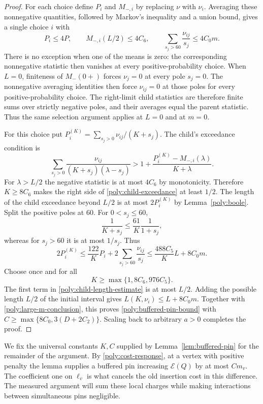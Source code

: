 \begin{proof}
For each choice define $P_i$ and $M_{-,i}$ by replacing $\nu$ with
$\nu_i$. Averaging these nonnegative quantities, followed by Markov's
inequality and a union bound, gives a single choice $i$ with
\begin{equation}\label{poly:small-m-selection}
 P_i\leq4P,\qquad
 M_{-,i}(L/2)\leq4C_6,\qquad
 \sum_{s_j>60}\frac{\nu_{ij}}{s_j}\leq4C_0m.
\end{equation}
There is no exception when one of the means is zero: the corresponding
nonnegative statistic then vanishes at every positive-probability
choice. When $L=0$, finiteness of $M_-(0+)$ forces $\nu_j=0$ at every
pole $s_j=0$. The nonnegative averaging identities then force
$\nu_{ij}=0$ at those poles for every positive-probability choice.
The right-limit child statistics are therefore finite sums over
strictly negative poles, and their averages equal the parent statistic.
Thus the same selection
argument applies at $L=0$ and at $m=0$.

For this choice put $P_i^{(K)}=\sum_{s_j>0}\nu_{ij}/(K+s_j)$.
The child's exceedance condition is
\begin{equation}\label{poly:child-exceedance}
 \sum_{s_j>0}\frac{\nu_{ij}}{(K+s_j)(\lambda-s_j)}
 >1+\frac{P_i^{(K)}-M_{-,i}(\lambda)}{K+\lambda}.
\end{equation}
For $\lambda>L/2$ the negative statistic is at most $4C_6$ by
monotonicity. Therefore $K\geq8C_6$ makes the right side of
\eqref{poly:child-exceedance} at least $1/2$. The length of the child
exceedance beyond $L/2$ is at most $2P_i^{(K)}$ by
Lemma~\ref{poly:boole}. Split the positive poles at $60$. For
$0<s_j\leq60$,
\[
 \frac{1}{K+s_j}\leq\frac{61}{K}\frac{1}{1+s_j},
\]
whereas for $s_j>60$ it is at most $1/s_j$. Thus
\begin{equation}\label{poly:child-length-estimate}
 2P_i^{(K)}
 \leq\frac{122}{K}P_i
       +2\sum_{s_j>60}\frac{\nu_{ij}}{s_j}
 \leq\frac{488C_5}{K}L+8C_0m.
\end{equation}
Choose once and for all
\[
 K\geq\max\{1,8C_6,976C_5\}.
\]
The first term in \eqref{poly:child-length-estimate} is at most $L/2$.
Adding the possible length $L/2$ of the initial interval gives
$L(K,\nu_i)\leq L+8C_0m$. Together with
\eqref{poly:large-m-conclusion}, this proves
\eqref{poly:buffered-pin-bound} with
$C\geq\max\{8C_0,3(D+2C_2)\}$. Scaling back to arbitrary $a>0$
completes the proof.
\end{proof}

We fix the universal constants $K,C$ supplied by
Lemma~\ref{lem:buffered-pin} for the remainder of the argument.
By \eqref{poly:cost-response}, at a vertex with positive penalty the
lemma supplies a buffered pin increasing $\mathcal E(Q)$ by at most
$Cm_v$. The coefficient one on
$\ell_v$ is what cancels the old insertion cost in this difference.
The measured argument will sum these local charges while making
interactions between simultaneous pins negligible.
